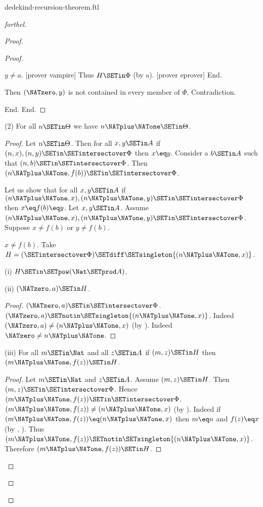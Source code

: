 \documentclass{stex}
\begin{document}
\begin{smodule}{dedekind-recursion-theorem.ftl}
\begin{proof}[forthel]
\begin{proof}
\begin{proof}
\begin{case}{$y \neq a$.}
              [prover vampire]
              Thus $H \SETin \Phi$ (by a).
              [prover eprover]
            End.

            Then $(\NATzero,y)$ is not contained in every member of $\Phi$.
            Contradiction.
          \end{case}
        End.
      End.
    \end{proof}

    (2) For all $n \SETin \Theta$ we have $n \NATplus \NATone \SETin \Theta$.
    \begin{proof}
      Let $n \SETin \Theta$.
      Then for all $x, y \SETin A$ if $(n, x), (n, y) \SETin \SETintersectover \Phi$ then
      $x \eq y$.
      Consider a $b \SETin A$ such that $(n,b) \SETin \SETintersectover \Phi$.
      Then $(n \NATplus \NATone, f(b)) \SETin \SETintersectover \Phi$.

      Let us show that for all $x, y \SETin A$ if $(n \NATplus \NATone, x),
      (n \NATplus \NATone, y) \SETin \SETintersectover \Phi$ then $x \eq f(b) \eq y$.
        Let $x, y \SETin A$.
        Assume $(n \NATplus \NATone, x), (n \NATplus \NATone, y) \SETin \SETintersectover \Phi$.
        Suppose $x \neq f(b)$ or $y \neq f(b)$.

        \begin{case}{$x \neq f(b)$.}
          Take $H = (\SETintersectover \Phi) \SETdiff \SETsingleton{(n \NATplus \NATone,x)}$.

          (i) $H \SETin \SETpow(\Nat \SETprod A)$.

          (ii) $(\NATzero,a) \SETin H$.
          \begin{proof}
            $(\NATzero,a) \SETin \SETintersectover \Phi$.
            $(\NATzero,a) \SETnotin \SETsingleton{(n \NATplus \NATone,x)}$.
            Indeed $(\NATzero,a) \neq (n \NATplus \NATone,x)$ (by ).
            Indeed $\NATzero \neq n \NATplus \NATone$.
          \end{proof}

          (iii) For all $m \SETin \Nat$ and all $z \SETin A$ if $(m,z) \SETin H$ then $(m \NATplus \NATone,f(z)) \SETin H$.
          \begin{proof}
            Let $m \SETin \Nat$ and $z \SETin A$.
            Assume $(m,z) \SETin H$.
            Then $(m,z) \SETin \SETintersectover \Phi$.
            Hence $(m \NATplus \NATone,f(z)) \SETin \SETintersectover \Phi$.
            $(m \NATplus \NATone,f(z)) \neq (n \NATplus \NATone,x)$ (by ).
            Indeed if $(m \NATplus \NATone,f(z)) \eq (n \NATplus \NATone,x)$ then $m \eq n$ and $f(z) \eq x$ (by , ).
            Thus $(m \NATplus \NATone,f(z)) \SETnotin \SETsingleton{(n \NATplus \NATone,x)}$.
            Therefore $(m \NATplus \NATone,f(z)) \SETin H$.
          \end{proof}


\end{case}
\end{proof}
\end{proof}
\end{proof}
\end{smodule}
\end{document}
